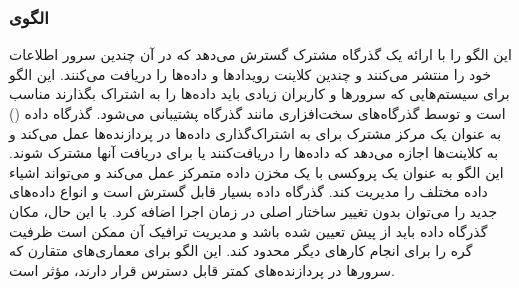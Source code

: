 \subsubsection{الگوی }
\label{distrDataBusSec}
\begin{RTL}
این الگو \cite{ref4}
 را با ارائه یک گذرگاه
مشترک گسترش می‌دهد که در آن چندین سرور اطلاعات خود را منتشر می‌کنند و چندین
کلاینت رویدادها و داده‌ها را دریافت می‌کنند.
این الگو برای سیستم‌هایی که سرورها و کاربران زیادی
باید داده‌ها را به اشتراک بگذارند مناسب است
و توسط گذرگاه‌های سخت‌افزاری مانند گذرگاه  پشتیبانی می‌شود.
گذرگاه داده ()
به عنوان یک مرکز مشترک برای به اشتراک‌گذاری داده‌ها در پردازنده‌ها
عمل می‌کند و به کلاینت‌ها اجازه می‌دهد که داده‌ها
را دریافت‌کنند یا برای دریافت آنها مشترک شوند.
این الگو به عنوان یک پروکسی با یک مخزن داده متمرکز عمل
می‌کند و می‌تواند اشیاء داده مختلف را مدیریت کند.
گذرگاه داده بسیار قابل گسترش است و انواع داده‌های جدید را
می‌توان بدون تغییر ساختار اصلی در زمان اجرا اضافه کرد.
با این حال، مکان گذرگاه داده باید از پیش تعیین شده باشد و مدیریت ترافیک
آن ممکن است ظرفیت گره را برای انجام کارهای دیگر محدود کند.
این الگو برای معماری‌های متقارن که سرورها در پردازنده‌های کمتر قابل
دسترس قرار دارند، مؤثر است.
\end{RTL}